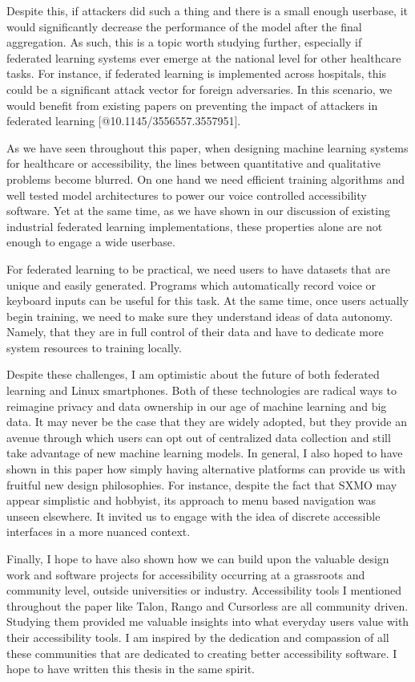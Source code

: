 \documentclass[manuscript,screen,review]{acmart}
\begin{document}
{Despite this, if attackers did such a thing and there is a small enough userbase, it would significantly decrease the performance of the model after the final aggregation. As such, this is a topic worth studying further, especially if federated learning systems ever emerge at the national level for other healthcare tasks. For instance, if federated learning is implemented across hospitals, this could be a significant attack vector for foreign adversaries. In this scenario, we would benefit from existing papers on preventing the impact of attackers in federated learning [@10.1145/3556557.3557951].


As we have seen throughout this paper, when designing machine learning systems for healthcare or accessibility, the lines between quantitative and qualitative problems become blurred. On one hand we need efficient training algorithms and well tested model architectures to power our voice controlled accessibility software. Yet at the same time, as we have shown in our discussion of existing industrial federated learning implementations, these properties alone are not enough to engage a wide userbase.

For federated learning to be practical, we need users to have datasets that are unique and easily generated. Programs which automatically record voice or keyboard inputs can be useful for this task. At the same time, once users actually begin training, we need to make sure they understand ideas of data autonomy. Namely, that they are in full control of their data and have to dedicate more system resources to training locally.

Despite these challenges, I am optimistic about the future of both federated learning and Linux smartphones. Both of these technologies are radical ways to reimagine privacy and data ownership in our age of machine learning and big data. It may never be the case that they are widely adopted, but they provide an avenue through which users can opt out of centralized data collection and still take advantage of new machine learning models. In general, I also hoped to have shown in this paper how simply having alternative platforms can provide us with fruitful new design philosophies. For instance, despite the fact that SXMO may appear simplistic and hobbyist, its approach to menu based navigation was unseen elsewhere. It invited us to engage with the idea of discrete accessible interfaces in a more nuanced context.

Finally, I hope to have also shown how we can build upon the valuable design work and software projects for accessibility occurring at a grassroots and community level, outside universities or industry. Accessibility tools I mentioned throughout the paper like Talon, Rango and Cursorless are all community driven. Studying them provided me valuable insights into what everyday users value with their accessibility tools. I am inspired by the dedication and compassion of all these communities that are dedicated to creating better accessibility software. I hope to have written this thesis in the same spirit.


}
\end{document}
